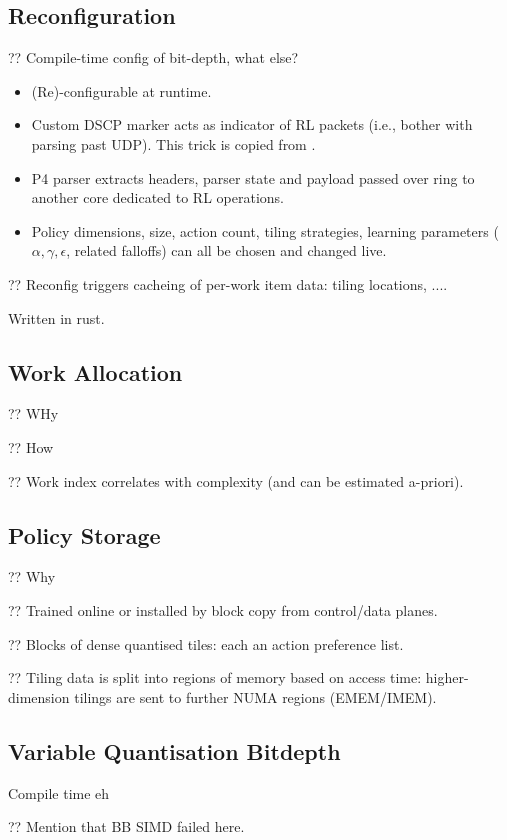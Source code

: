 \documentclass[sigconf,natbib=false]{acmart}
\begin{document}
\subsection{Reconfiguration}
?? Compile-time config of bit-depth, what else?

\begin{itemize}
	\item (Re)-configurable at runtime.
	\item Custom DSCP marker acts as indicator of RL packets (i.e., bother with parsing past UDP). This trick is copied from \textcite{DBLP:conf/isca/LiLYCSH19}.
	\item P4 parser extracts headers, parser state and payload passed over ring to another core dedicated to RL operations.
	\item Policy dimensions, size, action count, tiling strategies, learning parameters ($\alpha, \gamma, \epsilon$, related falloffs) can all be chosen and changed live.
\end{itemize}

?? Reconfig triggers cacheing of per-work item data: tiling locations, ....

Written in rust.

\subsection{Work Allocation}
?? WHy

?? How

?? Work index correlates with complexity (and can be estimated a-priori).

\subsection{Policy Storage}
?? Why

?? Trained online or installed by block copy from control/data planes.

?? Blocks of dense quantised tiles: each an action preference list.

?? Tiling data is split into regions of memory based on access time: higher-dimension tilings are sent to further NUMA regions (EMEM/IMEM).

\subsection{Variable Quantisation Bitdepth}
Compile time eh

?? Mention that BB SIMD failed here.
\end{document}
